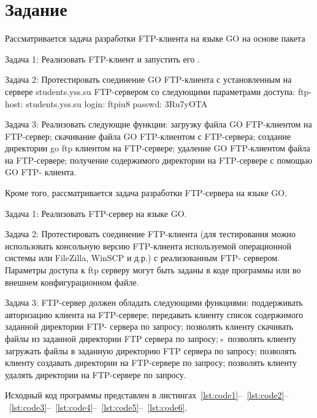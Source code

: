 \documentclass[a4paper, 14pt]{extarticle}
\begin{document}
\renewcommand{\ttdefault}{pcr}

\setlength{\tabcolsep}{3pt}
\newpage
\setcounter{page}{2}
\section{Задание}\label{Sect::task}
Рассматривается задача разработки FTP-клиента на языке GO на основе
пакета

Задача 1: Реализовать FTP-клиент и запустить его .

Задача 2: Протестировать соединение GO FTP-клиента с установленным на
сервере students.yss.su FTP-сервером со следующими параметрами доступа:
ftp-host: students.yss.su
login: ftpiu8
passwd: 3Ru7yOTA

Задача 3: Реализовать следующие функции:
загрузку файла GO FTP-клиентом на FTP-сервер;
скачивание файла GO FTP-клиентом с FTP-сервера;
создание директории go ftp клиентом на FTP-сервере;
удаление GO FTP-клиентом файла на FTP-сервере;
получение содержимого директории на FTP-сервере с помощью GO FTP-
клиента.

Кроме того, рассматривается задача разработки FTP-сервера на языке GO.

Задача 1: Реализовать FTP-сервер на языке GO.

Задача 2: Протестировать соединение FTP-клиента (для тестирования
можно использовать консольную версию FTP-клиента используемой
операционной системы или FileZilla, WinSCP и д.р.) с реализованным FTP-
сервером. Параметры доступа к ftp серверу могут быть заданы в коде программы
или во внешнем конфигурационном файле.

Задача 3: FTP-сервер должен обладать следующими функциями:
поддерживать авторизацию клиента на FTP-сервере;
передавать клиенту список содержимого заданной директории FTP-
сервера по запросу;
позволять клиенту скачивать файлы из заданной директории FTP сервера
по запросу;◦ позволять клиенту загружать файлы в заданную директорию FTP сервера
по запросу;
позволять клиенту создавать директории на FTP-сервере по запросу;
позволять клиенту удалять директории на FTP-сервере по запросу.

Исходный код программы представлен в листингах~\ref{lst:code1}--~\ref{lst:code2}--~\ref{lst:code3}--~\ref{lst:code4}--~\ref{lst:code5}--~\ref{lst:code6}.
\end{document}
